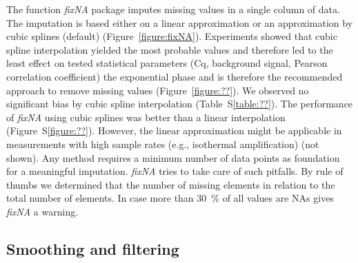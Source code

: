 \documentclass[twocolumn]{bmcart}%
\begin{document}
  The function \textsl{fixNA} package imputes missing values in a single column 
of data. The imputation is based either on a linear approximation or an 
approximation by cubic splines (default) (Figure~\ref{figure:fixNA}). 
Experiments showed that cubic spline interpolation yielded the most probable 
values and therefore led to the least effect on tested statistical parameters 
(Cq, background signal, Pearson correlation coefficient) the exponential phase 
and is therefore the recommended approach to remove missing values 
(Figure~\ref{figure:??}). We observed no significant bias by cubic spline 
interpolation (Table~S\ref{table:??}). The performance of \textsl{fixNA} using 
cubic splines was better than a linear interpolation (Figure~S\ref{figure:??}). 
However, the linear 
approximation might be applicable in measurements with high sample rates (e.g., 
isothermal amplification) (not shown). Any method requires a minimum number of 
data points as foundation for a meaningful imputation. \textsl{fixNA} tries to 
take care of such pitfalls. By rule of thumbs we determined that the number of 
missing elements in relation to the total number of elements. In case more than 
30~\% of all values are NAs gives \textsl{fixNA} a warning.

\subsection*{Smoothing and filtering}
\end{document}
